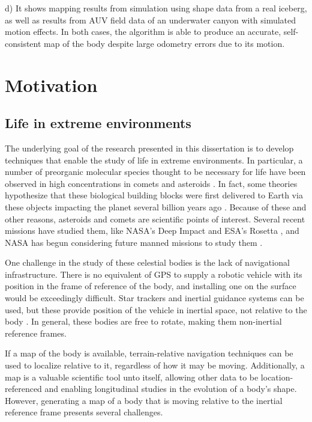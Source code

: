 d) It shows mapping results from simulation using shape data from a real iceberg, as well as results from AUV field data of an underwater canyon with simulated motion effects. In both cases, the algorithm is able to produce an accurate, self-consistent map of the body despite large odometry errors due to its motion.  



\section{Motivation}

\subsection{Life in extreme environments}

The underlying goal of the research presented in this dissertation is to develop techniques that enable the study of life in extreme environments. In particular, a number of preorganic molecular species thought to be necessary for life have been observed in high concentrations in comets and asteroids \cite{}. In fact, some theories hypothesize that these biological building blocks were first delivered to Earth via these objects impacting the planet several billion years ago \cite{}. Because of these and other reasons, asteroids and comets are scientific points of interest. Several recent missions have studied them, like NASA's Deep Impact \cite{} and ESA's Rosetta \cite{}, and NASA has begun considering future manned missions to study them \cite{}.

One challenge in the study of these celestial bodies is the lack of navigational infrastructure. There is no equivalent of GPS to supply a robotic vehicle with its position in the frame of reference of the body, and installing one on the surface would be exceedingly difficult. Star trackers and inertial guidance systems can be used, but these provide position of the vehicle in inertial space, not relative to the body \cite{}. In general, these bodies are free to rotate, making them non-inertial reference frames.

If a map of the body is available, terrain-relative navigation techniques can be used to localize relative to it, regardless of how it may be moving. Additionally, a map is a valuable scientific tool unto itself, allowing other data to be location-referenced and enabling longitudinal studies in the evolution of a body's shape. However, generating a map of a body that is moving relative to the inertial reference frame presents several challenges.

